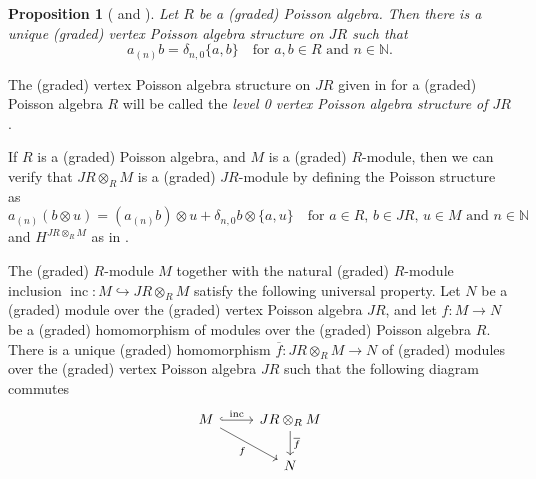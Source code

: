 \documentclass[a4paper, 12pt, reqno]{amsart}
\newtheorem{proposition}[theorem]{Proposition}
\theoremstyle{remark}
\DeclareMathOperator{\inc}{inc}
\begin{document}
\begin{proposition}[{\cite[Proposition 2.3.1]{arakawa_remark_2012}} and {}]
  \label{prp:6}
  Let $R$ be a (graded) Poisson algebra.
  Then there is a unique (graded) vertex Poisson algebra structure on $JR$ such that
  \begin{equation*}
    a_{(n)}b = \delta_{n, 0}\{a, b\} \quad \text{for $a, b \in R$ and $n \in \mathbb{N}$}.
  \end{equation*}
\end{proposition}

The (graded) vertex Poisson algebra structure on $JR$ given in  for a (graded) Poisson algebra $R$ will be called the \emph{level 0 vertex Poisson algebra structure of $JR$}.

If $R$ is a (graded) Poisson algebra, and $M$ is a (graded) $R$-module, then we can verify that $JR \otimes_R M$ is a (graded) $JR$-module by defining the Poisson structure as
\begin{equation*}
  a_{(n)}(b\otimes u) = (a_{(n)}b)\otimes u + \delta_{n, 0}b\otimes\{a, u\} \quad \text{for $a \in R$, $b \in JR$, $u \in M$ and $n \in \mathbb{N}$}
\end{equation*}
and $H^{JR \otimes_R M}$ as in .

The (graded) $R$-module $M$ together with the natural (graded) $R$-module inclusion $\inc: M \hookrightarrow JR \otimes_R M$ satisfy the following universal property.
Let $N$ be a (graded) module over the (graded) vertex Poisson algebra $JR$, and let $f: M \to N$ be a (graded) homomorphism of modules over the (graded) Poisson algebra $R$.
There is a unique (graded) homomorphism $\overline{f}: JR \otimes_R M \to N$ of (graded) modules over the (graded) vertex Poisson algebra $JR$ such that the following diagram commutes
\begin{equation*}
  \begin{tikzcd}
    M \arrow[r, "\inc", hook] \arrow[rd, "f"'] & JR \otimes_R M \arrow[d, "\overline{f}"] \\
    & N
  \end{tikzcd}
\end{equation*}



\end{document}
